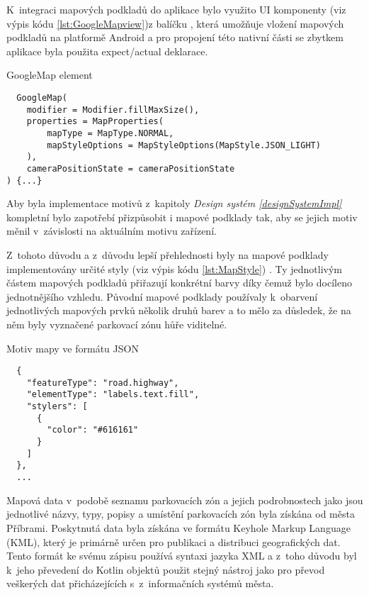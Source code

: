 K~integraci mapových podkladů do aplikace bylo využito UI komponenty  (viz výpis kódu \ref{lst:GoogleMapview})z balíčku 
, která umožňuje vložení mapových podkladů na platformě Android a pro propojení této nativní části 
se zbytkem aplikace byla použita expect/actual deklarace.


\begin{listing}[H]
\caption{GoogleMap element}\label{lst:GoogleMapview}
\begin{verbatim}
  GoogleMap(
    modifier = Modifier.fillMaxSize(),
    properties = MapProperties(
        mapType = MapType.NORMAL,
        mapStyleOptions = MapStyleOptions(MapStyle.JSON_LIGHT)
    ),
    cameraPositionState = cameraPositionState
) {...}
\end{verbatim}
\end{listing}


Aby byla implementace motivů z~kapitoly \textit{Design systém \ref{designSystemImpl}} kompletní bylo zapotřebí přizpůsobit i mapové podklady tak,
aby se jejich motiv měnil v~závislosti na aktuálním motivu zařízení.

Z~tohoto důvodu a z~důvodu lepší přehlednosti byly na mapové podklady implementovány určité styly (viz výpis kódu \ref{lst:MapStyle}) \cite{googleStyles}.
Ty jednotlivým částem mapových podkladů přiřazují konkrétní barvy díky čemuž bylo docíleno jednotnějšího vzhledu. Původní mapové podklady
používaly k~obarvení jednotlivých mapových prvků několik druhů barev a to mělo za důsledek, že na něm byly vyznačené parkovací zónu hůře viditelné.

\begin{listing}[H]
\caption{Motiv mapy ve formátu JSON}\label{lst:MapStyle}
\begin{verbatim}
  {
    "featureType": "road.highway",
    "elementType": "labels.text.fill",
    "stylers": [
      {
        "color": "#616161"
      }
    ]
  },
  ...
\end{verbatim}
\end{listing}

Mapová data v~podobě seznamu parkovacích zón a jejich podrobnostech jako jsou jednotlivé názvy, typy, popisy a umístění parkovacích zón byla 
získána od města Příbrami. Poskytnutá data byla získána ve formátu Keyhole Markup Language (KML), který je primárně určen pro publikaci a 
distribuci geografických dat. Tento formát ke svému zápisu používá syntaxi jazyka XML a z~toho důvodu byl k~jeho převedení do Kotlin objektů 
použit stejný nástroj jako pro převod veškerých dat přicházejících s~z~informačních systémů města.

